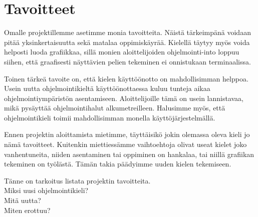 \section{Tavoitteet}
Omalle projektillemme asetimme monia tavoitteita.
Näistä tärkeimpänä voidaan pitää yksinkertaisuutta
sekä matalaa oppimiskäyrää.
Kielellä täytyy myös voida helposti luoda grafiikkaa,
sillä monien aloittelijoiden ohjelmointi-into loppuu siihen,
että graafisesti näyttävien pelien tekeminen ei onnistukaan terminaalissa.

Toinen tärkeä tavoite on,
että kielen käyttöönotto on mahdollisimman helppoa.
Usein uutta ohjelmointikieltä käyttöönottaessa
kuluu tunteja aikaa ohjelmointiympäristön asentamiseen.
Aloittelijoille tämä on usein lannistavaa,
mikä pysäyttää ohjelmointihalut alkumetreilleen.
Halusimme myös, että ohjelmointikieli toimii mahdollisimman monella käyttöjärjestelmällä.

Ennen projektin aloittamista mietimme,
täyttäisikö jokin olemassa oleva kieli jo nämä tavoitteet.
Kuitenkin miettiessämme vaihtoehtoja
olivat useat kielet joko vanhentuneita,
niiden asentaminen tai oppiminen on hankalaa,
tai niillä grafiikan tekeminen on työlästä.
Tämän takia päädyimme uuden kielen tekemiseen.

\begin{comment}
Usein uutta ohjelmointikieltä käyttöönottaessani
minulla kuluu enemmän aikaa ohjelmointiympäristön asentamiseen
kuin uuden kielen oppimiseen.
Vaikka tämä ongelma ei suoranaisesti
\end{comment}

\begin{anfxnote}
Tänne on tarkoitus listata projektin tavoitteita.
\\
Miksi uusi ohjelmointikieli?
\\
Mitä uutta?
\\
Miten erottuu?
\end{anfxnote}
